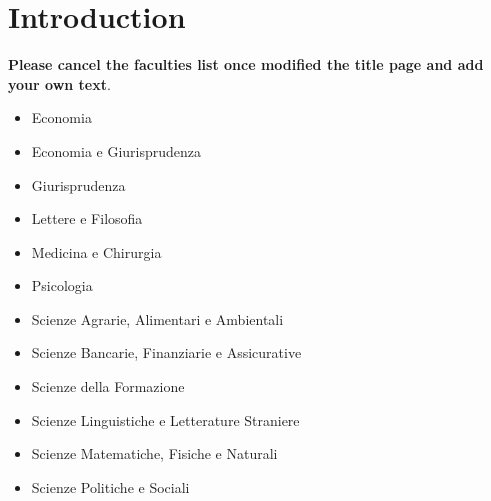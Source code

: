 
\pagestyle{fancy}

\chapter*{Introduction}
\label{Introduction}

\textbf{Please cancel the faculties list once modified the title page and add your own text}. \\

\begin{itemize}
	\item Economia
	\item Economia e Giurisprudenza
	\item Giurisprudenza
	\item Lettere e Filosofia
	\item Medicina e Chirurgia
	\item Psicologia
	\item Scienze Agrarie, Alimentari e Ambientali
	\item Scienze Bancarie, Finanziarie e Assicurative
	\item Scienze della Formazione
	\item Scienze Linguistiche e Letterature Straniere
	\item Scienze Matematiche, Fisiche e Naturali
	\item Scienze Politiche e Sociali
\end{itemize}


